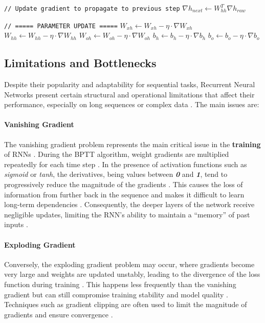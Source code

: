 \begin{algorithm}[H]
\begin{algorithmic}[1]
\Statex \texttt{// Update gradient to propagate to previous step}
\State $\nabla h_{next} \leftarrow W_{hh}^T \nabla h_{raw}$
\EndFor

\Statex
\Statex \texttt{// ===== PARAMETER UPDATE =====}
\State $W_{xh} \leftarrow W_{xh} - \eta \cdot \nabla W_{xh}$
\State $W_{hh} \leftarrow W_{hh} - \eta \cdot \nabla W_{hh}$
\State $W_{oh} \leftarrow W_{oh} - \eta \cdot \nabla W_{oh}$
\State $b_h \leftarrow b_h - \eta \cdot \nabla b_h$
\State $b_o \leftarrow b_o - \eta \cdot \nabla b_o$
\EndFor
\end{algorithmic}
\end{algorithm}



\subsection{Limitations and Bottlenecks}
\label{sub:limitazioni}
\noindent
Despite their popularity and adaptability for sequential tasks, Recurrent Neural Networks present certain structural and operational limitations that affect their performance, especially on long sequences or complex data \cite{cs231n-rnn, quarkml-rnn-explained}. The main issues are:

\paragraph{Vanishing Gradient}
The vanishing gradient problem represents the main critical issue in the \textbf{training} of RNNs \cite{analyticsvidhya}. During the BPTT algorithm, weight gradients are multiplied repeatedly for each time step \cite{quarkml-bptt}. In the presence of activation functions such as \textit{sigmoid} or \textit{tanh}, the derivatives, being values between \textbf{\textit{0}} and \textbf{\textit{1}}, tend to progressively reduce the magnitude of the gradients \cite{medium_math_rnn}. This causes the loss of information from further back in the sequence and makes it difficult to learn long-term dependencies \cite{analyticsvidhya}. Consequently, the deeper layers of the network receive negligible updates, limiting the RNN's ability to maintain a ``memory'' of past inputs \cite{cs231n-rnn}.

\paragraph{Exploding Gradient}
Conversely, the exploding gradient problem may occur, where gradients become very large and weights are updated unstably, leading to the divergence of the loss function during training \cite{analyticsvidhya}. This happens less frequently than the vanishing gradient but can still compromise training stability and model quality \cite{medium_math_rnn}. Techniques such as gradient clipping are often used to limit the magnitude of gradients and ensure convergence \cite{quarkml-bptt}.


